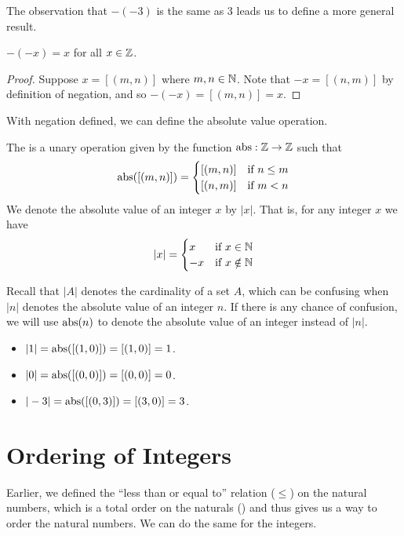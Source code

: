 The observation that $-(-3)$ is the same as 3 leads us to define a more general result.
\begin{proposition}
    $-(-x) = x$ for all $x \in \mathbb{Z}$.
\end{proposition}
\begin{proof}
    Suppose $x = [(m, n)]$ where $m, n \in \mathbb{N}$. Note that $-x = [(n, m)]$ by definition of negation, and so $-(-x) = [(m, n)] = x$.
\end{proof}

With negation defined, we can define the absolute value operation.
\begin{definition}
    The  is a unary operation given by the function $\mathrm{abs}: \mathbb{Z} \to \mathbb{Z}$ such that
    \[
        \mathrm{abs}([(m, n)]) = \begin{cases}
            [(m, n)] & \text{if } n \leq m\\
            [(n, m)] & \text{if } m < n
        \end{cases}
    \]
    We denote the absolute value of an integer $x$ by $|x|$. That is, for any integer $x$ we have
    \[
        |x| = \begin{cases}
            x & \text{if } x \in \mathbb{N}\\
            -x & \text{if } x \notin \mathbb{N}
        \end{cases}
    \]
\end{definition}
\begin{remark}
    Recall that $|A|$ denotes the cardinality of a set $A$, which can be confusing when $|n|$ denotes the absolute value of an integer $n$. If there is any chance of confusion, we will use $\mathrm{abs}(n)$ to denote the absolute value of an integer instead of $|n|$.
\end{remark}

\begin{example}
    \begin{itemize}[leftmargin=*]
        \item $|1| = \mathrm{abs}([(1, 0)]) = [(1, 0)] = 1$.
        \item $|0| = \mathrm{abs}([(0, 0)]) = [(0, 0)] = 0$.
        \item $|-3| = \mathrm{abs}([(0, 3)]) = [(3, 0)] = 3$.
    \end{itemize}
\end{example}

\section{Ordering of Integers}
Earlier, we defined the ``less than or equal to'' relation ($\leq$) on the natural numbers, which is a total order on the naturals () and thus gives us a way to order the natural numbers. We can do the same for the integers.

